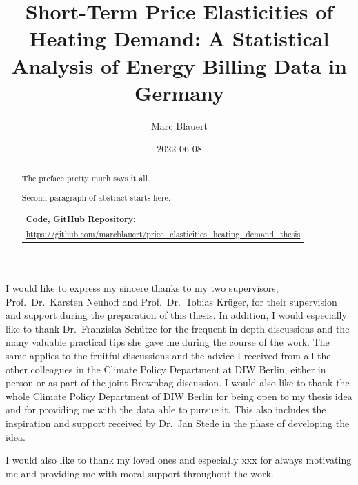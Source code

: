 \documentclass[12pt,twoside]{reedthesis}
\title{Short-Term Price Elasticities of Heating Demand: A Statistical Analysis of Energy Billing Data in Germany}
\author{Marc Blauert}
\date{2022-06-08}
\begin{document}
  \maketitle

\frontmatter %
\pagestyle{empty} %
  \begin{acknowledgements}
    I would like to express my sincere thanks to my two supervisors, Prof.~Dr.~Karsten Neuhoff and Prof.~Dr.~Tobias Krüger, for their supervision and support during the preparation of this thesis. In addition, I would especially like to thank Dr.~Franziska Schütze for the frequent in-depth discussions and the many valuable practical tips she gave me during the course of the work. The same applies to the fruitful discussions and the advice I received from all the other colleagues in the Climate Policy Department at DIW Berlin, either in person or as part of the joint Brownbag discussion. I would also like to thank the whole Climate Policy Department of DIW Berlin for being open to my thesis idea and for providing me with the data able to pursue it. This also includes the inspiration and support received by Dr.~Jan Stede in the phase of developing the idea.

    \par
    \bigskip

    I would also like to thank my loved ones and especially xxx for always motivating me and providing me with moral support throughout the work.
  \end{acknowledgements}

  \hypersetup{linkcolor=black}
  \setcounter{secnumdepth}{2}
  \setcounter{tocdepth}{2}
  \tableofcontents

  \listoftables

  \listoffigures
  \begin{abstract}
    The preface pretty much says it all.

    \par

    Second paragraph of abstract starts here.

    \bigskip \bigskip \noindent
    \begin{tabular}{m{14cm}} \hline \textbf{Code, GitHub Repository:}                                                            \\ \footnotesize \url{https://github.com/marcblauert/price_elasticities_heating_demand_thesis}    \\ \hline \end{tabular}
  \end{abstract}
\end{document}
